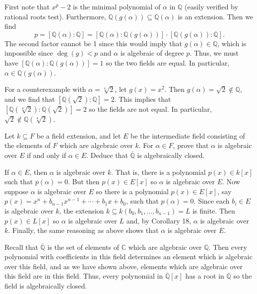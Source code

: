 \documentclass[../../master.tex]{subfiles}
\begin{document}
\begin{solution}
    First note that $x^{p} - 2$ is the minimal polynomial of $\alpha$ in $\mathbb{Q}$ (easily verified by rational roots test).
    Furthermore, $\mathbb{Q}(g(\alpha)) \subseteq \mathbb{Q}(\alpha)$ is an extension.
    Then we find
    \[
        p = [\mathbb{Q}(\alpha) : \mathbb{Q}] = [\mathbb{Q}(\alpha) : \mathbb{Q}(g(\alpha))] \cdot [\mathbb{Q}(g(\alpha)) : \mathbb{Q}].
    \]
    The second factor cannot be 1 since this would imply that $g(\alpha) \in \mathbb{Q}$, which is impossible since $\deg(g) < p$ and $\alpha$ is algebraic of degree $p$.
    Thus, we must have $[\mathbb{Q}(\alpha) : \mathbb{Q}(g(\alpha))] = 1$ so the two fields are equal.
    In particular, $\alpha \in \mathbb{Q}(g(\alpha))$.

    For a counterexample with $\alpha = \sqrt[4]{2}$, let $g(x) = x^2$.
    Then $g(\alpha) = \sqrt{2} \notin \mathbb{Q}$, and we find that $[\mathbb{Q}(\sqrt{2}) : \mathbb{Q}] = 2$.
    This implies that $[\mathbb{Q}(\sqrt[4]{2}) : \mathbb{Q}(\sqrt{2})] = 2$ so the fields are not equal.
    In particular, $\sqrt{2} \notin \mathbb{Q}(\sqrt[4]{2})$.
\end{solution}

\begin{problem}
    Let $k \subseteq F$ be a field extension, and let $E$ be the intermediate field consisting of the elements of $F$ which are algebraic over $k$.
    For $\alpha \in F$, prove that $\alpha$ is algebraic over $E$ if and only if $\alpha \in E$.
    Deduce that $\overline{\mathbb{Q}}$ is algebraically closed.
\end{problem}

\begin{solution}
    If $\alpha \in E$, then $\alpha$ is algebraic over $k$.
    That is, there is a polynomial $p(x) \in k[x]$ such that $p(\alpha) = 0$.
    But then $p(x) \in E[x]$ so $\alpha$ is algebraic over $E$.
    Now suppose $\alpha$ is algebraic over $E$ so there is a polynomial $p(x) \in E[x]$, say $p(x) = x^{n} + b_{n-1}x^{n-1} + \cdots + b_1 x + b_0$, such that $p(\alpha) = 0$.
    Since each $b_i \in E$ is algebraic over $k$, the extension $k \subseteq k(b_0, b_1, \ldots, b_{n-1}) = L$ is finite.
    Then $p(x) \in L[x]$ so $\alpha$ is algebraic over $L$ and, by Corollary 18, $\alpha$ is algebraic over $k$.
    Finally, the same reasoning as above shows that $\alpha$ is algebraic over $E$.

    Recall that $\overline{\mathbb{Q}}$ is the set of elements of $\mathbb{C}$ which are algebraic over $\mathbb{Q}$.
    Then every polynomial with coefficients in this field determines an element which is algebraic over this field, and as we have shown above, elements which are algebraic over this field are in this field.
    Thus, every polynomial in $\overline{\mathbb{Q}}[x]$ has a root in $\overline{\mathbb{Q}}$ so the field is algebraically closed.
\end{solution}
\end{document}
